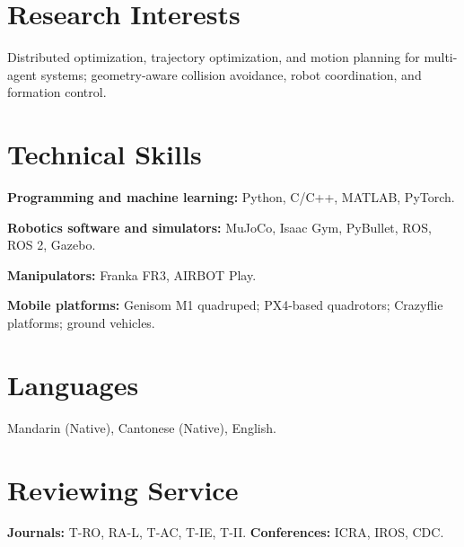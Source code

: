 \documentclass[10pt,a4paper]{article}
\begin{document}
\section{Research Interests}
Distributed optimization, trajectory optimization, and motion planning for multi-agent systems;
geometry-aware collision avoidance, robot coordination, and formation control.

\section{Technical Skills}
\textbf{Programming and machine learning:} Python, C/C++, MATLAB, PyTorch.\par
\textbf{Robotics software and simulators:} MuJoCo, Isaac Gym, PyBullet, ROS, ROS 2, Gazebo.\par
\textbf{Manipulators:} Franka FR3, AIRBOT Play.\par
\textbf{Mobile platforms:} Genisom M1 quadruped; PX4-based quadrotors; Crazyflie platforms; ground vehicles.

\section{Languages}
Mandarin (Native), Cantonese (Native), English.

\section{Reviewing Service}
\textbf{Journals:} T-RO, RA-L, T-AC, T-IE, T-II. \qquad \textbf{Conferences:} ICRA, IROS, CDC.
\end{document}
